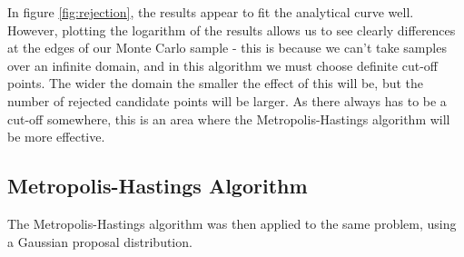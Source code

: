 \documentclass[a4paper,11pt,twoside]{article}
\begin{document}
In figure \ref{fig:rejection}, the results appear to fit the analytical curve well.
However, plotting the logarithm of the results allows us to see clearly differences at
the edges of our Monte Carlo sample - this is because we can't take samples over
an infinite domain, and in this algorithm we must choose definite cut-off
points. The wider the domain the smaller the effect of this will be, but the
number of rejected candidate points will be larger. As there always has to be a
cut-off somewhere, this is an area where the Metropolis-Hastings algorithm will
be more effective. 

\subsection{Metropolis-Hastings Algorithm} 
The Metropolis-Hastings algorithm was then applied to the same problem, using a
Gaussian proposal distribution. 
\end{document}
